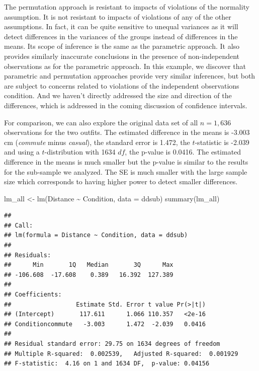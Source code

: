 \documentclass[
]{book}
\newenvironment{Shaded}{\begin{snugshade}}{\end{snugshade}}
\newcommand{\AttributeTok}[1]{\textcolor[rgb]{0.77,0.63,0.00}{#1}}
\newcommand{\FunctionTok}[1]{\textcolor[rgb]{0.00,0.00,0.00}{#1}}
\newcommand{\NormalTok}[1]{#1}
\newcommand{\OtherTok}[1]{\textcolor[rgb]{0.56,0.35,0.01}{#1}}
\newcommand{\SpecialCharTok}[1]{\textcolor[rgb]{0.00,0.00,0.00}{#1}}
\begin{document}
\indent The permutation approach is resistant
to impacts of violations of the
normality assumption. It is not resistant to impacts of violations of any of
the other assumptions.
In fact, it can be quite sensitive to unequal variances
as it will detect differences in the variances of the groups instead of
differences in the means. Its scope of inference is the same as the parametric
approach.  It also provides similarly inaccurate conclusions in the presence
of non-independent observations as for the parametric approach. In this
example, we discover that parametric and permutation approaches provide very
similar inferences, but both are subject to concerns related to violations of the independent observations condition. And we haven't directly addressed the size and direction of the differences, which is addressed in the coming discussion of confidence intervals.

\indent For comparison, we can also explore the original data set of all \(n = 1,636\) observations for the two outfits. The estimated difference in the means is -3.003 cm (\emph{commute} minus \emph{casual}), the standard error is 1.472, the \(t\)-statistic is -2.039 and using a \(t\)-distribution with 1634 \(df\), the p-value is 0.0416. The estimated difference in the means is much smaller but the p-value is similar to the results for the sub-sample we analyzed. The SE is much smaller with the large sample size which corresponds to having higher power to detect smaller differences.

\begin{Shaded}
\begin{Highlighting}[]
\NormalTok{lm\_all }\OtherTok{\textless{}{-}} \FunctionTok{lm}\NormalTok{(Distance }\SpecialCharTok{\textasciitilde{}}\NormalTok{ Condition, }\AttributeTok{data =}\NormalTok{ ddsub)}
\FunctionTok{summary}\NormalTok{(lm\_all)}
\end{Highlighting}
\end{Shaded}

\begin{verbatim}
## 
## Call:
## lm(formula = Distance ~ Condition, data = ddsub)
## 
## Residuals:
##      Min       1Q   Median       3Q      Max 
## -106.608  -17.608    0.389   16.392  127.389 
## 
## Coefficients:
##                  Estimate Std. Error t value Pr(>|t|)
## (Intercept)       117.611      1.066 110.357   <2e-16
## Conditioncommute   -3.003      1.472  -2.039   0.0416
## 
## Residual standard error: 29.75 on 1634 degrees of freedom
## Multiple R-squared:  0.002539,   Adjusted R-squared:  0.001929 
## F-statistic:  4.16 on 1 and 1634 DF,  p-value: 0.04156
\end{verbatim}
\end{document}
